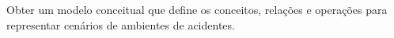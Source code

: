 Obter um modelo conceitual que define os conceitos, relações e operações para representar cenários de ambientes de acidentes.